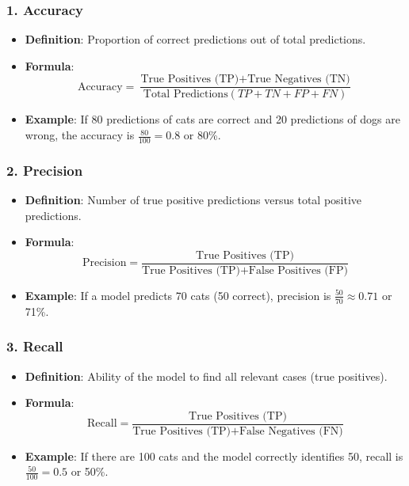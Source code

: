 \documentclass[aspectratio=169]{beamer}
\begin{document}
\begin{frame}[fragile]
    \frametitle{1. Accuracy}
    \begin{itemize}
        \item \textbf{Definition}: Proportion of correct predictions out of total predictions.
        \item \textbf{Formula}:
            \begin{equation}
            \text{Accuracy} = \frac{\text{True Positives (TP)} + \text{True Negatives (TN)}}{\text{Total Predictions} (TP + TN + FP + FN)}
            \end{equation}
        \item \textbf{Example}: 
            If 80 predictions of cats are correct and 20 predictions of dogs are wrong, the accuracy is 
            \( \frac{80}{100} = 0.8 \) or 80\%.
    \end{itemize}
\end{frame}

\begin{frame}[fragile]
    \frametitle{2. Precision}
    \begin{itemize}
        \item \textbf{Definition}: Number of true positive predictions versus total positive predictions.
        \item \textbf{Formula}:
            \begin{equation}
            \text{Precision} = \frac{\text{True Positives (TP)}}{\text{True Positives (TP)} + \text{False Positives (FP)}}
            \end{equation}
        \item \textbf{Example}: 
            If a model predicts 70 cats (50 correct), precision is 
            \( \frac{50}{70} \approx 0.71 \) or 71\%.
    \end{itemize}
\end{frame}

\begin{frame}[fragile]
    \frametitle{3. Recall}
    \begin{itemize}
        \item \textbf{Definition}: Ability of the model to find all relevant cases (true positives).
        \item \textbf{Formula}:
            \begin{equation}
            \text{Recall} = \frac{\text{True Positives (TP)}}{\text{True Positives (TP)} + \text{False Negatives (FN)}}
            \end{equation}
        \item \textbf{Example}: 
            If there are 100 cats and the model correctly identifies 50, recall is 
            \( \frac{50}{100} = 0.5 \) or 50\%.
    \end{itemize}
\end{frame}
\end{document}
